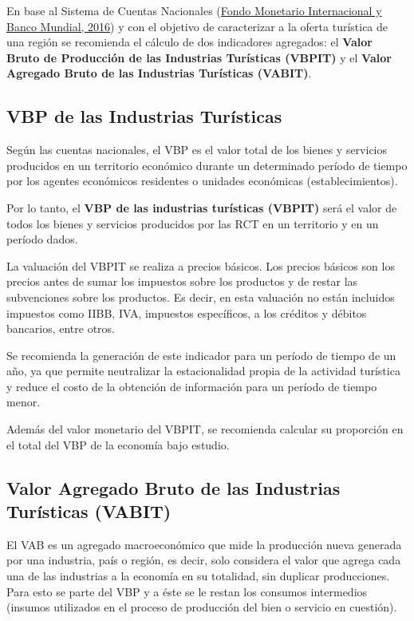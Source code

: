 \documentclass[
  openany]{book}
\begin{document}
En base al Sistema de Cuentas Nacionales (\protect\hyperlink{ref-scn2008}{Fondo Monetario Internacional y Banco Mundial, 2016}) y con el objetivo de caracterizar a la oferta turística de una región se recomienda el cálculo de dos indicadores agregados: el \textbf{Valor Bruto de Producción de las Industrias Turísticas (VBPIT)} y el \textbf{Valor Agregado Bruto de las Industrias Turísticas (VABIT)}.

\hypertarget{valor-bruto-de-produccion}{%
\subsection{VBP de las Industrias Turísticas}\label{valor-bruto-de-produccion}}

Según las cuentas nacionales, el VBP es el valor total de los bienes y servicios producidos en un territorio económico durante un determinado período de tiempo por los agentes económicos residentes o unidades económicas (establecimientos).

Por lo tanto, el \textbf{VBP de las industrias turísticas (VBPIT)} será el valor de todos los bienes y servicios producidos por las RCT en un territorio y en un período dados.

La valuación del VBPIT se realiza a precios básicos. Los precios básicos son los precios antes de sumar los impuestos sobre los productos y de restar las subvenciones sobre los productos. Es decir, en esta valuación no están incluidos impuestos como IIBB, IVA, impuestos específicos, a los créditos y débitos bancarios, entre otros.

Se recomienda la generación de este indicador para un período de tiempo de un año, ya que permite neutralizar la estacionalidad propia de la actividad turística y reduce el costo de la obtención de información para un período de tiempo menor.

Además del valor monetario del VBPIT, se recomienda calcular su proporción en el total del VBP de la economía bajo estudio.

\hypertarget{valor-agregado-bruto-de-las-industrias-turuxedsticas-vabit}{%
\subsection{Valor Agregado Bruto de las Industrias Turísticas (VABIT)}\label{valor-agregado-bruto-de-las-industrias-turuxedsticas-vabit}}

El VAB es un agregado macroeconómico que mide la producción nueva generada por una industria, país o región, es decir, solo considera el valor que agrega cada una de las industrias a la economía en su totalidad, sin duplicar producciones. Para esto se parte del VBP y a éste se le restan los consumos intermedios (insumos utilizados en el proceso de producción del bien o servicio en cuestión).
\end{document}
